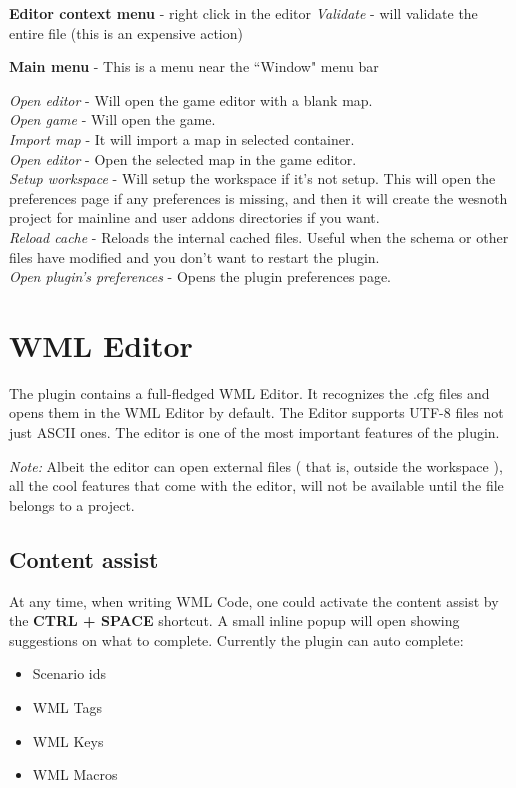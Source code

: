 \documentclass[10pt]{article}
\begin{document}
\begin{description}
\item{\textbf{Editor context menu}} - right click in the editor
   \textit{Validate} - will validate the entire file (this is an expensive action)

\item{\textbf{Main menu}} - This is a menu near the ``Window" menu bar

   \textit{Open editor} - Will open the game editor with a blank map.\\
   \textit{Open game} - Will open the game.\\
   \textit{Import map} - It will import a map in selected container.\\
   \textit{Open editor} - Open the selected map in the game editor.\\
   \textit{Setup workspace} - Will setup the workspace if it's not setup. This will open the preferences page if any preferences is missing, and then it will create the wesnoth project for mainline and user addons directories if you want.\\
   \textit{Reload cache} - Reloads the internal cached files. Useful when the schema or other files have modified and you don't want to restart the plugin.\\
   \textit{Open plugin's preferences} - Opens the plugin preferences page.\\
\end{description}

\section{WML Editor}
The plugin contains a full-fledged WML Editor. It recognizes the .cfg files and opens them in the WML Editor by default. The Editor supports UTF-8 files not just ASCII ones. The editor is one of the most important features of the plugin.

\textit{Note:} Albeit the editor can open external files ( that is, outside the workspace ), all the cool features that come with the editor, will not be available until the file belongs to a project.

\subsection{Content assist}
At any time, when writing WML Code, one could activate the content assist by the \textbf{CTRL + SPACE} shortcut. A small inline popup will open showing suggestions on what to complete. Currently the plugin can auto complete:
\begin{itemize}
  \item Scenario ids
  \item WML Tags
  \item WML Keys
  \item WML Macros
\end{itemize}
\end{document}
